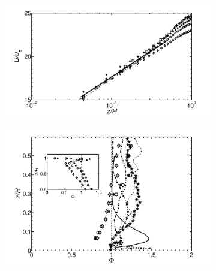 \documentclass[times]{fldauth}
\begin{document}
\begin{figure}
\centering
        \begin{subfigure}[t]{0.55\textwidth}
                \includegraphics[width=\linewidth]{Fig3/velcomp_filter_paper.pdf}
                \caption{}
                \label{fig:velocity}
        \end{subfigure}%
        \centering
        \begin{subfigure}[t]{0.45\textwidth}
                \includegraphics[width=\linewidth]{Fig3/gradient_filt.pdf}
                \caption{}
                \label{fig:gradient}
        \end{subfigure}

\end{figure}
\end{document}
